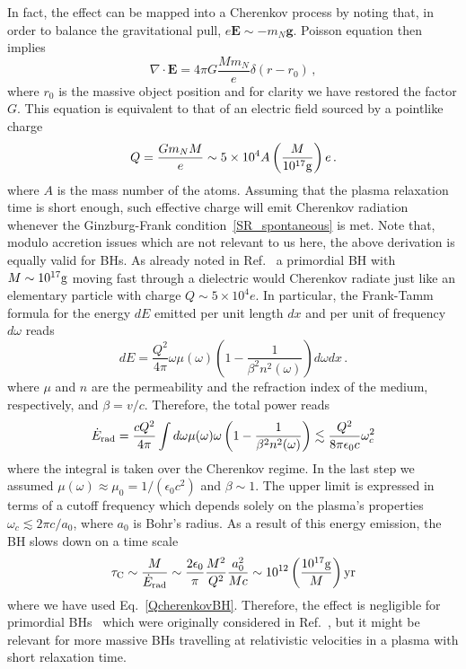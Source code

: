 \documentclass[11pt]{article}
\newcommand{\be}{\begin{equation}}
\newcommand{\ee}{\end{equation}}
\numberwithin{equation}{section} %
\begin{document}
In fact, the effect can be mapped into a Cherenkov process by noting that, in order to balance the gravitational pull, $e\mathbf{E}\sim-m_N \mathbf{g}$. Poisson equation then implies~\cite{Bekenstein:1998nt}
%
\be
\nabla\cdot\mathbf{E}=4\pi G\frac{M m_N}{e}\delta(r-r_0)\,,
\ee
%
where $r_0$ is the massive object position and for clarity we have restored the factor $G$. This equation is equivalent to that of an electric field sourced by a pointlike charge 
%
\begin{equation}
 Q=\frac{G m_N M}{e}\sim 5\times 10^4 A \left(\frac{M}{10^{17}{\rm g}}\right)e\,. \label{QcherenkovBH}
\end{equation}
%
where $A$ is the mass number of the atoms. Assuming that the plasma relaxation time is short enough, such effective charge will emit Cherenkov radiation whenever the Ginzburg-Frank condition~\eqref{SR_spontaneous} is met. 
Note that, modulo accretion issues which are not relevant to us here, the above derivation is equally valid for BHs. As already noted in Ref.~\cite{Bekenstein:1998nt} a primordial BH with $M\sim 10^{17}{\rm g}$ moving fast through a dielectric would Cherenkov radiate just like an elementary particle with charge $Q\sim 5\times 10^4e$. In particular, the Frank-Tamm formula for the energy $dE$ emitted per unit length $dx$ and per unit of frequency $d\omega$ reads
\be
dE=\frac{Q^2}{4\pi} \omega \mu(\omega)\left(1-\frac{1}{\beta^2 n^2(\omega)}\right)d\omega dx \,.
\ee
where $\mu$ and $n$ are the permeability and the refraction index of the medium, respectively, and $\beta=v/c$. Therefore, the total power reads
\begin{equation}
 \dot{E}_{\rm rad}=\frac{c Q^2}{4\pi}\int d\omega \mu(\omega)\omega\left(1-\frac{1}{\beta^2 n^2(\omega)}\right) \lesssim \frac{Q^2}{8\pi \epsilon_0 c}\omega_c^2
\end{equation}
where the integral is taken over the Cherenkov regime. In the last step we assumed $\mu(\omega)\approx \mu_0=1/(\epsilon_0 c^2)$ and $\beta\sim1$. The upper limit is expressed in terms of a cutoff frequency which depends solely on the plasma's properties $\omega_c \lesssim 2\pi c/a_0$, where $a_0$ is Bohr's radius. As a result of this energy emission, the BH slows down on a time scale
\begin{equation}
 \tau_{\rm C}\sim \frac{M}{\dot{E}_{\rm rad}}\sim \frac{2\epsilon_0}{\pi}\frac{M^2}{Q^2}\frac{a_0^2}{Mc}\sim 10^{12}\left(\frac{10^{17}{\rm g}}{M}\right) {\rm yr}
\end{equation}
where we have used Eq.~\eqref{QcherenkovBH}. Therefore, the effect is negligible for primordial BHs~\cite{Carr:2009jm} which were originally considered in Ref.~\cite{Bekenstein:1998nt}, but it might be relevant for more massive BHs travelling at relativistic velocities in a plasma with short relaxation time.
\end{document}
